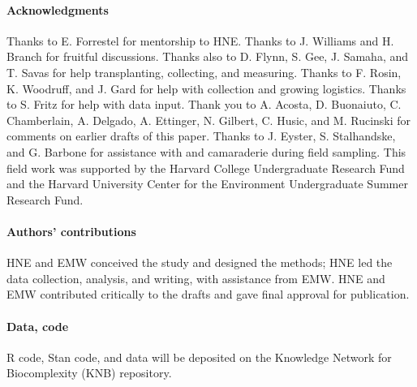 \documentclass[12pt]{article}\usepackage[]{graphicx}\usepackage[]{color}
\begin{document}
\paragraph{Acknowledgments}
Thanks to E. Forrestel for mentorship to HNE. Thanks to J. Williams and H. Branch for fruitful discussions. Thanks also to D. Flynn, S. Gee, J. Samaha, and T. Savas for help transplanting, collecting, and measuring. Thanks to F. Rosin, K. Woodruff, and J. Gard for help with collection and growing logistics. Thanks to S. Fritz for help with data input. Thank you to A. Acosta, D. Buonaiuto, C. Chamberlain, A. Delgado, A. Ettinger, N. Gilbert, C. Husic, and M. Rucinski for comments on earlier drafts of this paper. Thanks to J. Eyster, S. Stalhandske, and G. Barbone for assistance with and camaraderie during field sampling. This field work was supported by the Harvard College Undergraduate Research Fund and the Harvard University Center for the Environment Undergraduate Summer Research Fund. 

\paragraph{Authors' contributions} HNE and EMW conceived the study and designed the methods; HNE led the data collection, analysis, and writing, with assistance from EMW. HNE and EMW contributed critically to the drafts and gave final approval for publication.

\paragraph{Data, code} 
R code, Stan code, and data will be deposited on the Knowledge Network for Biocomplexity (KNB) repository. 
\printbibliography 
\end{document}

